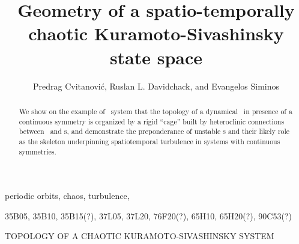 \documentclass{siamltex}
\begin{document}
                \title{
Geometry of a spatio-temporally chaotic Kuramoto-Sivashinsky state space
                 }
                  \author{
Predrag Cvitanovi\'c\footnotemark[1],
Ruslan L. Davidchack\footnotemark[2],
    and
Evangelos Siminos\footnotemark[1]
                    }


                \maketitle

\renewcommand{\thefootnote}{\fnsymbol{footnote}}
\renewcommand{\thefootnote}{\arabic{footnote}}

                \begin{abstract}
We show on the example of \KS\ system
that the topology of a dynamical \statesp\ in presence of
a continuous symmetry is organized by
a rigid ``cage'' built by heteroclinic connections
between \eqva\ and \rpo s, and demonstrate the
preponderance of unstable \rpo s and their likely
role as the skeleton underpinning spatiotemporal turbulence in
systems with continuous symmetries.
                \end{abstract}

\begin{keywords}
periodic orbits, chaos, turbulence, {\KSe}
\end{keywords}

\begin{AMS}
35B05, 35B10, 35B15(?), 37L05, 37L20, 76F20(?), 65H10, 65H20(?), 90C53(?)
\end{AMS}

\pagestyle{myheadings}
\thispagestyle{plain}
         {TOPOLOGY OF A CHAOTIC KURAMOTO-SIVASHINSKY SYSTEM}
\end{document}
